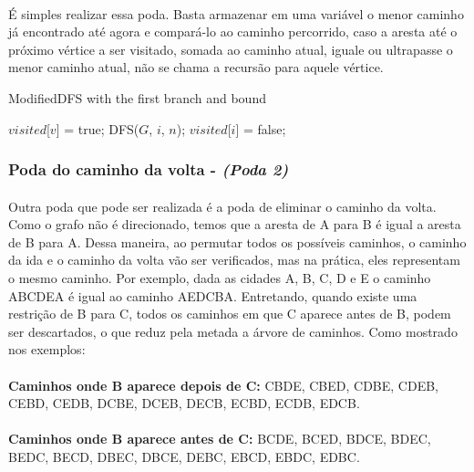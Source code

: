 \documentclass[a4paper, 12pt]{article}
\begin{document}
\paragraph{}
É simples realizar essa poda. Basta armazenar em uma variável o menor caminho já encontrado até agora e compará-lo ao caminho percorrido, caso a aresta até o próximo vértice a ser visitado, somada ao caminho atual, iguale ou ultrapasse o menor caminho atual, não se chama a recursão para aquele vértice.

\begin{algorithm}
\caption{ModifiedDFS with the first branch and bound}
\begin{algorithmic}
    \State $visited$[$v$] = true;
				\State DFS($G$, $i$, $n$);
				\State $visited$[$i$] = false;			
			\EndIf
		\EndIf
    \EndFor
\EndFunction
\end{algorithmic}
\end{algorithm}

\subsubsection{Poda do caminho da volta - \textit{(Poda 2)}}
\paragraph{}
Outra poda que pode ser realizada é a poda de eliminar o caminho da volta. Como o grafo não é direcionado, temos que a aresta de A para B é igual a aresta de B para A. Dessa maneira, ao permutar todos os possíveis caminhos, o caminho da ida e o caminho da volta vão ser verificados, mas na prática, eles representam o mesmo caminho. Por exemplo, dada as cidades A, B, C, D e E o caminho ABCDEA é igual ao caminho AEDCBA. Entretando, quando existe uma restrição de B para C, todos os caminhos em que C aparece antes de B, podem ser descartados, o que reduz pela metada a árvore de caminhos. Como mostrado nos exemplos:

\paragraph{}
\textbf{Caminhos onde B aparece depois de C: } CBDE, CBED, CDBE, CDEB, CEBD, CEDB, DCBE, DCEB, DECB, ECBD, ECDB, EDCB.

\paragraph{}
\textbf{Caminhos onde B aparece antes de C: } BCDE, BCED, BDCE, BDEC, BEDC, BECD, DBEC, DBCE, DEBC, EBCD, EBDC, EDBC.
\end{document}
